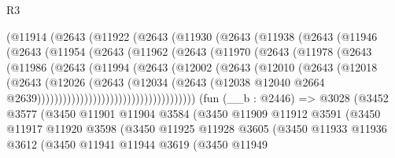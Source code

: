 \begin{lexlean}{R3}
\begin{coremodule}
            (@11914
              (@2643
                (@11922
                  (@2643
                    (@11930
                      (@2643
                        (@11938
                          (@2643
                            (@11946
                              (@2643
                                (@11954
                                  (@2643
                                    (@11962
                                      (@2643
                                        (@11970
                                          (@2643
                                            (@11978
                                              (@2643
                                                (@11986
                                                  (@2643
                                                    (@11994
                                                      (@2643
                                                        (@12002
                                                          (@2643
                                                            (@12010
                                                              (@2643
                                                                (@12018
                                                                  (@2643
                                                                    (@12026
                                                                      (@2643
                                                                        (@12034
                                                                          (@2643
                                                                            (@12038
                                                                              @12040
                                                                              @2664
                                                                              @2639)))))))))))))))))))))))))))))))))))))
    (fun (__b : @2446) =>
    @3028
      (@3452
        @3577
        (@3450
          @11901
          @11904
          @3584
          (@3450
            @11909
            @11912
            @3591
            (@3450
              @11917
              @11920
              @3598
              (@3450
                @11925
                @11928
                @3605
                (@3450
                  @11933
                  @11936
                  @3612
                  (@3450
                    @11941
                    @11944
                    @3619
                    (@3450
                      @11949

\end{coremodule}
\end{lexlean}
